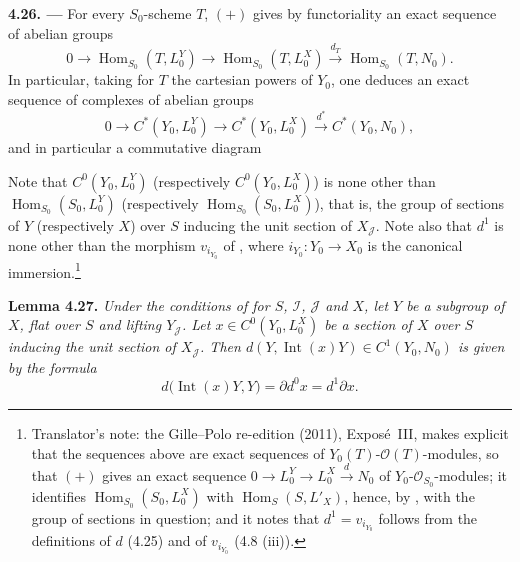 \medskip
\noindent{}\textbf{4.26. ---}
For every \(S_0\)-scheme \(T\), \((+)\) gives by functoriality an exact
sequence of abelian groups
\[
 0\longrightarrow\operatorname{Hom}_{S_0}(T,L_0^Y)
 \longrightarrow\operatorname{Hom}_{S_0}(T,L_0^X)
 \xrightarrow{d_T}\operatorname{Hom}_{S_0}(T,N_0).
\]
In particular, taking for \(T\) the cartesian powers of \(Y_0\), one
deduces an exact sequence of complexes of abelian groups
\[
 0\longrightarrow C^*(Y_0,L_0^Y)
 \longrightarrow C^*(Y_0,L_0^X)
 \xrightarrow{d^*}C^*(Y_0,N_0),
\]
and in particular a commutative diagram

\begin{center}
\end{center}

Note that \(C^0(Y_0,L_0^Y)\) (respectively \(C^0(Y_0,L_0^X)\)) is none
other than \(\operatorname{Hom}_{S_0}(S_0,L_0^Y)\) (respectively
\(\operatorname{Hom}_{S_0}(S_0,L_0^X)\)), that is, the group of sections of
\(Y\) (respectively \(X\)) over \(S\) inducing the unit section of
\(X_{\mathscr J}\). Note also that \(d^1\) is none other than the morphism
\(v_{i_{Y_0}}\) of , where \(i_{Y_0}:Y_0\to X_0\) is the
canonical immersion.\footnote{Translator's note: the Gille--Polo re-edition (2011), Exposé~III, makes explicit
that the sequences above are exact sequences of
\(Y_0(T)\)-\(\mathscr O(T)\)-modules, so that \((+)\) gives an exact sequence
\(0\to L_0^Y\to L_0^X\xrightarrow{d}N_0\) of \(Y_0\)-\(\mathscr O_{S_0}\)-modules;
it identifies \(\operatorname{Hom}_{S_0}(S_0,L_0^X)\) with
\(\operatorname{Hom}_S(S,L'_X)\), hence, by , with the group of sections
in question; and it notes that \(d^1=v_{i_{Y_0}}\) follows from the
definitions of \(d\) (4.25) and of \(v_{i_{Y_0}}\) (4.8 (iii)).}

\medskip
\noindent{}\textbf{Lemma 4.27.}
\textit{Under the conditions of  for \(S\), \(\mathscr I\),
\(\mathscr J\) and \(X\), let \(Y\) be a subgroup of \(X\), flat over
\(S\) and lifting \(Y_{\mathscr J}\). Let \(x\in C^0(Y_0,L_0^X)\) be a
section of \(X\) over \(S\) inducing the unit section of
\(X_{\mathscr J}\). Then \(d(Y,\operatorname{Int}(x)Y)\in C^1(Y_0,N_0)\) is
given by the formula}
\[
 d\bigl(\operatorname{Int}(x)Y,Y\bigr)=\partial d^0x=d^1\partial x.
\]

